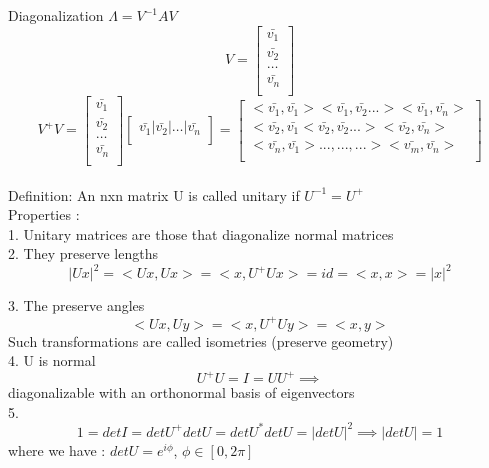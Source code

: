 \documentclass{article}
\begin{document}
Diagonalization $ \Lambda = V^{-1} A V $ \\
$$ V= 
\begin{bmatrix}
\bar{v_1} \\
\bar{v_2}\\
\dots \\
\bar{v_n} \\
\end{bmatrix}
$$
$$ V^+ V = 
\begin{bmatrix}
\bar{v_1} \\
\bar{v_2}\\
\dots \\
\bar{v_n} \\
\end{bmatrix}
\begin{bmatrix}
\bar{v_1} |\bar {v_2} |\dots| \bar{v_n} \\
\end{bmatrix}
 = 
\begin{bmatrix}
< \bar{v_1} ,\bar{v_1}> < \bar{v_1} ,\bar{v_2} ...> < \bar{v_1} ,\bar{v_n}>\\
< \bar{v_2} ,\bar{v_1} < \bar{v_2} ,\bar{v_2} ... >< \bar{v_2} ,\bar{v_n}>\\
< \bar{v_n} ,\bar{v_1}> ... , ..., ...> < \bar{v_m} ,\bar{v_n} >\\
\end{bmatrix}
$$\\
Definition: An nxn matrix U is called unitary if $ U^{-1} = U^+$ \\
Properties : \\

1. Unitary matrices are those that diagonalize normal matrices\\

2. They preserve lengths $$ |Ux|^2 = <Ux, Ux> = <x,U^+Ux> = id= <x,x> = |x|^2 $$ 

3. The preserve angles $$<Ux,Uy> = <x,U^+Uy> = <x,y>  $$
Such transformations are called isometries (preserve geometry)\\

4. U is normal 
$$U^+ U = I = UU^+ \implies  $$  diagonalizable with an orthonormal basis of eigenvectors\\

5.$$ 1 = det I = det U^+ detU = det U^* det U = |detU|^2 \implies |detU| = 1 $$
where we have : $detU =  e^{i\phi} $, $\phi \in [0,2\pi] $ \\
\end{document}
